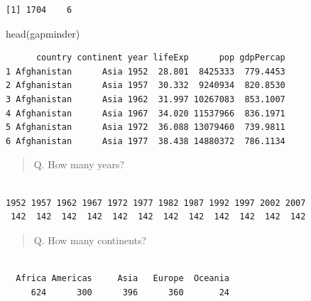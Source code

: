 \documentclass[
  letterpaper,
  DIV=11,
  numbers=noendperiod]{scrartcl}
\newenvironment{Shaded}{\begin{snugshade}}{\end{snugshade}}
\newcommand{\FunctionTok}[1]{\textcolor[rgb]{0.28,0.35,0.67}{#1}}
\newcommand{\NormalTok}[1]{\textcolor[rgb]{0.00,0.23,0.31}{#1}}
\newcommand{\SpecialCharTok}[1]{\textcolor[rgb]{0.37,0.37,0.37}{#1}}
\begin{document}
\begin{verbatim}
[1] 1704    6
\end{verbatim}

\begin{Shaded}
\begin{Highlighting}[]
\FunctionTok{head}\NormalTok{(gapminder)}
\end{Highlighting}
\end{Shaded}

\begin{verbatim}
      country continent year lifeExp      pop gdpPercap
1 Afghanistan      Asia 1952  28.801  8425333  779.4453
2 Afghanistan      Asia 1957  30.332  9240934  820.8530
3 Afghanistan      Asia 1962  31.997 10267083  853.1007
4 Afghanistan      Asia 1967  34.020 11537966  836.1971
5 Afghanistan      Asia 1972  36.088 13079460  739.9811
6 Afghanistan      Asia 1977  38.438 14880372  786.1134
\end{verbatim}

\begin{quote}
Q. How many years?
\end{quote}

\begin{Shaded}
\end{Shaded}

\begin{verbatim}

1952 1957 1962 1967 1972 1977 1982 1987 1992 1997 2002 2007 
 142  142  142  142  142  142  142  142  142  142  142  142 
\end{verbatim}

\begin{quote}
Q. How many continents?
\end{quote}

\begin{Shaded}
\end{Shaded}

\begin{verbatim}

  Africa Americas     Asia   Europe  Oceania 
     624      300      396      360       24 
\end{verbatim}
\end{document}
